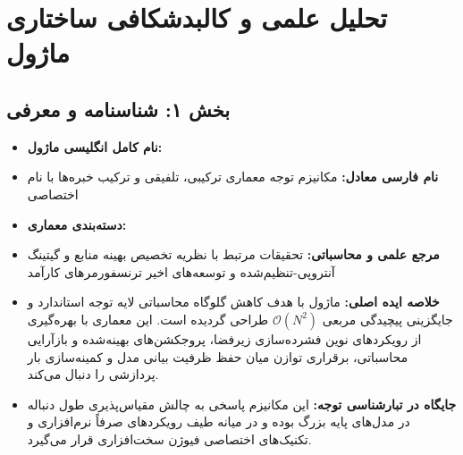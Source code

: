 \section{تحلیل علمی و کالبدشکافی ساختاری ماژول }

\subsection*{بخش ۱: شناسنامه و معرفی }
\begin{itemize}
    \item \textbf{نام کامل انگلیسی ماژول:} 
    \item \textbf{نام فارسی معادل:} مکانیزم توجه معماری ترکیبی، تلفیقی و ترکیب خبره‌ها  با نام اختصاصی 
    \item \textbf{دسته‌بندی معماری:} 
    \item \textbf{مرجع علمی و محاسباتی:} تحقیقات مرتبط با نظریه تخصیص بهینه منابع و گیتینگ آنتروپی-تنظیم‌شده و توسعه‌های اخیر ترنسفورمرهای کارآمد
    \item \textbf{خلاصه ایده اصلی:} ماژول  با هدف کاهش گلوگاه محاسباتی لایه توجه استاندارد و جایگزینی پیچیدگی مربعی $\mathcal{O}(N^2)$ طراحی گردیده است. این معماری با بهره‌گیری از رویکردهای نوین فشرده‌سازی زیرفضا، پروجکشن‌های بهینه‌شده و بازآرایی محاسباتی، برقراری توازن میان حفظ ظرفیت بیانی مدل و کمینه‌سازی بار پردازشی را دنبال می‌کند.
    \item \textbf{جایگاه در تبارشناسی توجه:} این مکانیزم پاسخی به چالش مقیاس‌پذیری طول دنباله در مدل‌های پایه بزرگ بوده و در میانه طیف رویکردهای صرفاً نرم‌افزاری و تکنیک‌های اختصاصی فیوژن سخت‌افزاری قرار می‌گیرد.
\end{itemize}

